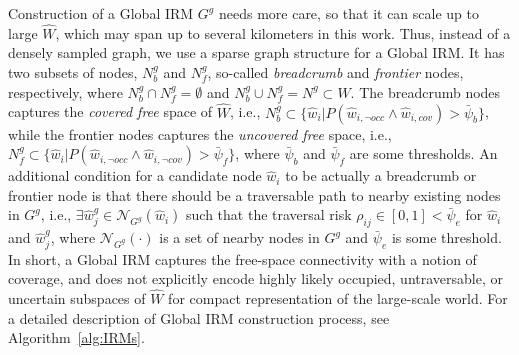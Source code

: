 \documentclass[letterpaper]{article} %
\newcommand{\phdone}[1]{} %
\begin{document}
\phdone{Global IRM}
Construction of a Global IRM $G^g$ needs more care, so that it can scale up to large $\hat{W}$, which may span up to several kilometers in this work.
Thus, instead of a densely sampled graph, we use a sparse graph structure for a Global IRM.
%
It has two subsets of nodes, $N^g_b$ and $N^g_f$, so-called \textit{breadcrumb} and \textit{frontier} nodes, respectively, where $N^g_b \cap N^g_f = \emptyset$ and $N^g_b \cup N^g_f = N^g \! \subset \! \hat{W}$.
%
The breadcrumb nodes captures the \textit{covered free} space of $\hat{W}$, i.e., $N^g_b \subset \{\hat{w}_i | P(\hat{w}_{i,\neg occ} \wedge \hat{w}_{i,cov}) > \bar{\psi}_b\}$, while
the frontier nodes captures the \textit{uncovered free} space, i.e., $N^g_f \subset \{\hat{w}_i | P(\hat{w}_{i,\neg occ} \wedge \hat{w}_{i,\neg cov}) > \bar{\psi}_f\}$,
where $\bar{\psi}_b$ and $\bar{\psi}_f$ are some thresholds.
%
An additional condition for a candidate node $\hat{w}_i$ to be actually a breadcrumb or frontier node is that there should be a traversable path to nearby existing nodes in $G^g$, i.e., $\exists \hat{w}^g_j \in \mathcal{N}_{G^g}(\hat{w}_i)$ such that the traversal risk $\rho_{ij} \in [0, 1] < \bar{\psi}_e$ for $\hat{w}_i$ and $\hat{w}^g_j$, where $\mathcal{N}_{G^g}(\cdot)$ is a set of nearby nodes in $G^g$ and $\bar{\psi}_e$ is some threshold.
%
In short, a Global IRM captures the free-space connectivity with a notion of coverage, and does not explicitly encode highly likely occupied, untraversable, or uncertain subspaces of $\hat{W}$ for compact representation of the large-scale world.
%
For a detailed description of Global IRM construction process, see Algorithm~\ref{alg:IRMs}.
\end{document}
